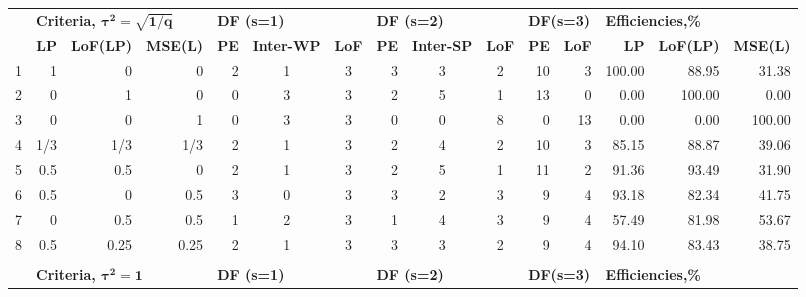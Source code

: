 \begin{table}[h]
{\begin{tabular}{rrrrccccccrrrrr}
  & \multicolumn{3}{l}{\textbf{Criteria, $\bm{\tau^2=\sqrt{1/q}}$}}    & \multicolumn{3}{l}{\textbf{DF (s=1)}}   & \multicolumn{3}{l}{\textbf{DF (s=2)}}    & \multicolumn{2}{l}{\textbf{DF(s=3)}} & \multicolumn{3}{l}{\textbf{Efficiencies,\%}}     \\
  & \textbf{LP} & \textbf{LoF(LP)} & \textbf{MSE(L)} & \textbf{PE} & \textbf{Inter-WP} & \textbf{LoF} & \textbf{PE} & \textbf{Inter-SP} & \textbf{LoF}& \textbf{PE}      & \textbf{LoF}      & \textbf{LP} & \textbf{LoF(LP)} & \textbf{MSE(L)} \\
1 & 1    & 0    & 0    & \multicolumn{1}{|r}{2} & 1 & 3 & \multicolumn{1}{|r}{3} & 3 & 2 & \multicolumn{1}{|r}{10} & 3  & \multicolumn{1}{|r}{100.00} & 88.95  & 31.38  \\
2 & 0    & 1    & 0    & \multicolumn{1}{|r}{0} & 3 & 3 & \multicolumn{1}{|r}{2} & 5 & 1 & \multicolumn{1}{|r}{13} & 0  & \multicolumn{1}{|r}{0.00}   & 100.00 & 0.00   \\
3 & 0    & 0    & 1    & \multicolumn{1}{|r}{0} & 3 & 3 & \multicolumn{1}{|r}{0} & 0 & 8 & \multicolumn{1}{|r}{0}  & 13 & \multicolumn{1}{|r}{0.00}   & 0.00   & 100.00 \\
4 & 1/3 & 1/3 & 1/3    & \multicolumn{1}{|r}{2} & 1 & 3 & \multicolumn{1}{|r}{2} & 4 & 2 & \multicolumn{1}{|r}{10} & 3  & \multicolumn{1}{|r}{85.15}  & 88.87  & 39.06  \\
5 & 0.5  & 0.5  & 0    & \multicolumn{1}{|r}{2} & 1 & 3 & \multicolumn{1}{|r}{2} & 5 & 1 & \multicolumn{1}{|r}{11} & 2  & \multicolumn{1}{|r}{91.36}  & 93.49  & 31.90  \\
6 & 0.5  & 0    & 0.5  & \multicolumn{1}{|r}{3} & 0 & 3 & \multicolumn{1}{|r}{3} & 2 & 3 & \multicolumn{1}{|r}{9}  & 4  & \multicolumn{1}{|r}{93.18}  & 82.34  & 41.75  \\
7 & 0    & 0.5  & 0.5  & \multicolumn{1}{|r}{1} & 2 & 3 & \multicolumn{1}{|r}{1} & 4 & 3 & \multicolumn{1}{|r}{9}  & 4  & \multicolumn{1}{|r}{57.49}  & 81.98  & 53.67  \\
8 & 0.5  & 0.25 & 0.25 & \multicolumn{1}{|r}{2} & 1 & 3 & \multicolumn{1}{|r}{3} & 3 & 2 & \multicolumn{1}{|r}{9}  & 4  & \multicolumn{1}{|r}{94.10}  & 83.43  & 38.75  \\
  &      &      &      &   &   &   &   &   &   &    &    &        &        &   \\  
  & \multicolumn{3}{l}{\textbf{Criteria, $\bm{\tau^2=1}$}}    & \multicolumn{3}{l}{\textbf{DF (s=1)}}   & \multicolumn{3}{l}{\textbf{DF (s=2)}}    & \multicolumn{2}{l}{\textbf{DF(s=3)}} & \multicolumn{3}{l}{\textbf{Efficiencies,\%}}     \\

\end{tabular}}
\end{table}
